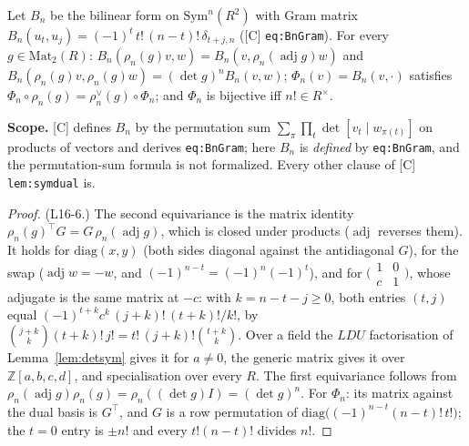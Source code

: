 \begin{lemma}\label{lem:symdual}
  \leanok
  Let $B_n$ be the bilinear form on $\mathrm{Sym}^n(R^2)$ with Gram matrix
  $B_n(u_t,u_j)=(-1)^t\,t!\,(n-t)!\,\delta_{t+j,n}$ ([C] \texttt{eq:BnGram}). For every $g\in\mathrm{Mat}_2(R)$:
  $B_n(\rho_n(g)v,w)=B_n(v,\rho_n(\operatorname{adj}g)w)$ and $B_n(\rho_n(g)v,\rho_n(g)w)=(\det g)^nB_n(v,w)$;
  $\Phi_n(v)=B_n(v,\cdot)$ satisfies $\Phi_n\circ\rho_n(g)=\rho_n^\vee(g)\circ\Phi_n$; and $\Phi_n$ is bijective iff
  $n!\in R^\times$.

  \textbf{Scope.} [C] defines $B_n$ by the permutation sum $\sum_\pi\prod_t\det[v_t\mid w_{\pi(t)}]$ on products of
  vectors and derives \texttt{eq:BnGram}; here $B_n$ is \emph{defined} by \texttt{eq:BnGram}, and the permutation-sum
  formula is not formalized. Every other clause of [C] \texttt{lem:symdual} is.
\end{lemma}
\begin{proof}
  \leanok
  (L16-6.) The second equivariance is the matrix identity $\rho_n(g)^{\top}G=G\,\rho_n(\operatorname{adj}g)$, which is
  closed under products ($\operatorname{adj}$ reverses them). It holds for $\mathrm{diag}(x,y)$ (both sides diagonal
  against the antidiagonal $G$), for the swap ($\operatorname{adj}w=-w$, and $(-1)^{n-t}=(-1)^n(-1)^t$), and for
  $\bigl(\begin{smallmatrix}1&0\\c&1\end{smallmatrix}\bigr)$, whose adjugate is the same matrix at $-c$: with
  $k=n-t-j\ge0$, both entries $(t,j)$ equal $(-1)^{t+k}c^k\,(j+k)!\,(t+k)!/k!$, by
  $\binom{j+k}{k}(t+k)!\,j!=t!\,(j+k)!\binom{t+k}{k}$. Over a field the $LDU$ factorisation of
  Lemma~\ref{lem:detsym} gives it for $a\ne0$, the generic matrix gives it over $\mathbb Z[a,b,c,d]$, and
  specialisation over every $R$. The first equivariance follows from
  $\rho_n(\operatorname{adj}g)\rho_n(g)=\rho_n((\det g)I)=(\det g)^n$. For $\Phi_n$: its matrix against the dual
  basis is $G^{\top}$, and $G$ is a row permutation of $\mathrm{diag}\bigl((-1)^{n-t}(n-t)!\,t!\bigr)$; the $t=0$ entry
  is $\pm n!$ and every $t!(n-t)!$ divides $n!$.
\end{proof}

